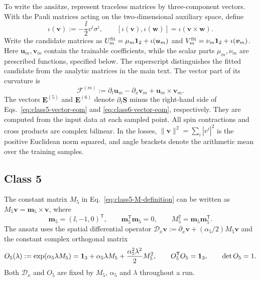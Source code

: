 To write the ans\"atze, represent traceless matrices by three-component
vectors.  With the Pauli matrices acting on the two-dimensional auxiliary
space, define
\begin{equation}
\iota(\boldsymbol v):=-\frac{\ii}{2}v^i\sigma^i,
\qquad
[\iota(\boldsymbol v),\iota(\boldsymbol w)]
=\iota(\boldsymbol v\times\boldsymbol w).
\label{eq:ml-iota}
\end{equation}
Write the candidate matrices as
$U_m^{\rm fit}=\mu_m\mathbf{1}_2+\iota(\boldsymbol u_m)$ and
$V_m^{\rm fit}=\nu_m\mathbf{1}_2+\iota(\boldsymbol v_m)$.
Here $\boldsymbol u_m,\boldsymbol v_m$ contain the trainable coefficients,
while the scalar parts $\mu_m,\nu_m$ are prescribed functions, specified
below.  The superscript distinguishes the fitted candidate from the
analytic matrices in the main text.
The vector part of its curvature is
\begin{equation}
\boldsymbol{\mathcal F}^{(m)}
:=\partial_t\boldsymbol u_m-\partial_x\boldsymbol v_m
  +\boldsymbol u_m\times\boldsymbol v_m.
\label{eq:ml-vector-curvature}
\end{equation}
The vectors $\boldsymbol E^{(5)}$ and $\boldsymbol E^{(6)}$ denote
$\partial_t\boldsymbol S$ minus the right-hand side of
Eqs.~\eqref{eq:class5-vector-eom} and \eqref{eq:class6-vector-eom},
respectively.  They are computed from the input data at each sampled point.
All spin contractions and cross products are complex bilinear.
In the losses, $\|\boldsymbol v\|^2=\sum_i|v^i|^2$ is the positive
Euclidean norm squared, and angle brackets denote the arithmetic mean
over the training samples.

\subsection{Class 5}
\label{sec:ml-class5-paper}

The constant matrix $M_5$ in Eq.~\eqref{eq:class5-M-definition} can be
written as $M_5\boldsymbol v=\boldsymbol m_5\times\boldsymbol v$, where
\begin{equation}
\boldsymbol m_5=(\ii,-1,0)^{\mathsf T},
\qquad \boldsymbol m_5^{\mathsf T}\boldsymbol m_5=0,
\qquad M_5^2=\boldsymbol m_5\boldsymbol m_5^{\mathsf T}.
\label{eq:ml-null-vector}
\end{equation}
The ansatz uses the spatial differential operator
$\mathcal D_x\boldsymbol v:=\partial_x\boldsymbol v
+(\alpha_5/2)M_5\boldsymbol v$ and the constant complex orthogonal matrix
\begin{equation}
O_5(\lambda):=\exp(\alpha_5\lambda M_5)
=\mathbf{1}_3+\alpha_5\lambda M_5
 +\frac{\alpha_5^2\lambda^2}{2}M_5^2,
\qquad O_5^{\mathsf T}O_5=\mathbf{1}_3,
\qquad\det O_5=1.
\label{eq:ml-class5-rotation}
\end{equation}
Both $\mathcal D_x$ and $O_5$ are fixed by $M_5$, $\alpha_5$ and
$\lambda$ throughout a run.

